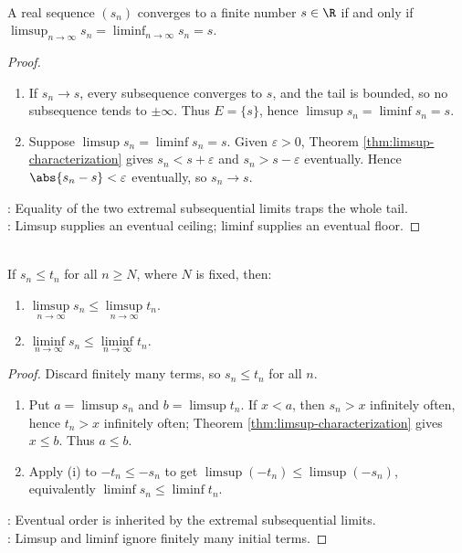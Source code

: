 \begin{theorem} \label{thm:convergence-iff-limsup-liminf-equal} \\
A real sequence $(s_n)$ converges to a finite number $s\in\R$ if and only if $\limsup_{n\to\infty}s_n=\liminf_{n\to\infty}s_n=s$.
\begin{proof}
\begin{enumerate}[label=\roman*.]
\setlength{\itemsep}{0pt}
\item[$(\Rightarrow)$] If $s_n\to s$, every subsequence converges to $s$, and the tail is bounded, so no subsequence tends to $\pm\infty$. Thus $E=\{s\}$, hence $\limsup s_n=\liminf s_n=s$.
\item[$(\Leftarrow)$] Suppose $\limsup s_n=\liminf s_n=s$. Given $\varepsilon>0$, Theorem \ref{thm:limsup-characterization} gives $s_n<s+\varepsilon$ and $s_n>s-\varepsilon$ eventually. Hence $\abs{s_n-s}<\varepsilon$ eventually, so $s_n\to s$.
\end{enumerate}
: Equality of the two extremal subsequential limits traps the whole tail.\\
: Limsup supplies an eventual ceiling; liminf supplies an eventual floor.
\end{proof}
\end{theorem}

\begin{theorem} \label{thm:limsup-liminf-order-comparison} \\
If $s_n\leq t_n$ for all $n\geq N$, where $N$ is fixed, then:
\begin{enumerate}[label=(\roman*)]
\setlength{\itemsep}{0pt}
\item $\limsup\limits_{n\to\infty}s_n\leq \limsup\limits_{n\to\infty}t_n$.
\item $\liminf\limits_{n\to\infty}s_n\leq \liminf\limits_{n\to\infty}t_n$.
\end{enumerate}
\begin{proof}
Discard finitely many terms, so $s_n\leq t_n$ for all $n$.
\begin{enumerate}[label=(\roman*)]
\setlength{\itemsep}{0pt}
\item Put $a=\limsup s_n$ and $b=\limsup t_n$. If $x<a$, then $s_n>x$ infinitely often, hence $t_n>x$ infinitely often; Theorem \ref{thm:limsup-characterization} gives $x\leq b$. Thus $a\leq b$.
\item Apply (i) to $-t_n\leq -s_n$ to get $\limsup(-t_n)\leq\limsup(-s_n)$, equivalently $\liminf s_n\leq\liminf t_n$.
\end{enumerate}
: Eventual order is inherited by the extremal subsequential limits.\\
: Limsup and liminf ignore finitely many initial terms.
\end{proof}
\end{theorem}


